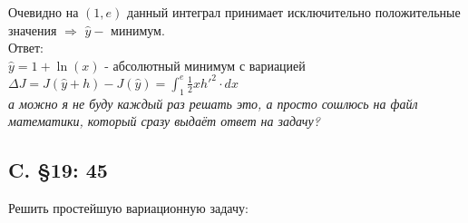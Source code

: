 \documentclass{article}
\begin{document}
Очевидно на $(1,e)$ данный интеграл принимает исключительно положительные значения $\Rightarrow$ $\hat y -$ минимум.\\
Ответ: \\
$\hat y = 1+\ln(x)$    - абсолютный минимум с вариацией $\Delta J = J(\hat y + h) - J(\hat y) = \int_1^e\frac{1}{2}x h'^2 \cdot dx $                       \\
 \textcolor[rgb]{0.480469,0.566406,0.480469}{\textit{а можно я не буду каждый раз решать это, а просто сошлюсь на файл математики, который сразу выдаёт ответ на задачу?}}                                                   

\subsection{C. \S19: 45}
Решить простейшую вариационную задачу:
\end{document}
